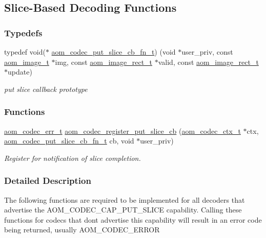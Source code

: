 \hypertarget{group__cap__put__slice}{}\subsection{Slice-\/\+Based Decoding Functions}
\label{group__cap__put__slice}
\subsubsection*{Typedefs}
\begin{DoxyCompactItemize}
\item 
typedef void($\ast$ \hyperlink{group__cap__put__slice_ga1eedb3b2df824386126cff04c0ce5bc9}{aom\+\_\+codec\+\_\+put\+\_\+slice\+\_\+cb\+\_\+fn\+\_\+t}) (void $\ast$user\+\_\+priv, const \hyperlink{aom__image_8h_a5409ae8fdb326fe1cc32622ef4e23748}{aom\+\_\+image\+\_\+t} $\ast$img, const \hyperlink{aom__image_8h_aeb7bd8cffc46083daea9b1955b8f245d}{aom\+\_\+image\+\_\+rect\+\_\+t} $\ast$valid, const \hyperlink{aom__image_8h_aeb7bd8cffc46083daea9b1955b8f245d}{aom\+\_\+image\+\_\+rect\+\_\+t} $\ast$update)
\begin{DoxyCompactList}\small\item\em put slice callback prototype \end{DoxyCompactList}\end{DoxyCompactItemize}
\subsubsection*{Functions}
\begin{DoxyCompactItemize}
\item 
\hyperlink{group__codec_gaaae61e0f8663e6137f1e228757248e7c}{aom\+\_\+codec\+\_\+err\+\_\+t} \hyperlink{group__cap__put__slice_ga1146b3f996a8a2347fa7157f7826957d}{aom\+\_\+codec\+\_\+register\+\_\+put\+\_\+slice\+\_\+cb} (\hyperlink{group__codec_ga9a1d27f9742d9f70783e3c6cb849b5b4}{aom\+\_\+codec\+\_\+ctx\+\_\+t} $\ast$ctx, \hyperlink{group__cap__put__slice_ga1eedb3b2df824386126cff04c0ce5bc9}{aom\+\_\+codec\+\_\+put\+\_\+slice\+\_\+cb\+\_\+fn\+\_\+t} cb, void $\ast$user\+\_\+priv)
\begin{DoxyCompactList}\small\item\em Register for notification of slice completion. \end{DoxyCompactList}\end{DoxyCompactItemize}


\subsubsection{Detailed Description}
The following functions are required to be implemented for all decoders that advertise the A\+O\+M\+\_\+\+C\+O\+D\+E\+C\+\_\+\+C\+A\+P\+\_\+\+P\+U\+T\+\_\+\+S\+L\+I\+CE capability. Calling these functions for codecs that don\textquotesingle{}t advertise this capability will result in an error code being returned, usually A\+O\+M\+\_\+\+C\+O\+D\+E\+C\+\_\+\+E\+R\+R\+OR 


